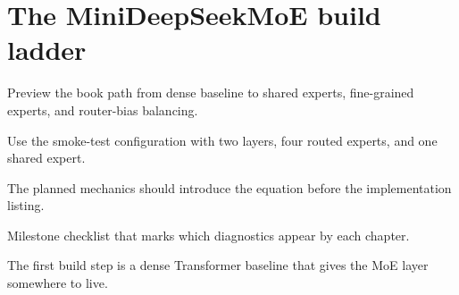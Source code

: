 \section{The MiniDeepSeekMoE build ladder}
\label{sec:ch01-the-minideepseekmoe-build-ladder}

Preview the book path from dense baseline to shared experts, fine-grained experts, and router-bias balancing.



Use the smoke-test configuration with two layers, four routed experts, and one shared expert.



The planned mechanics should introduce the equation before the implementation listing.





\begin{checkpointbox}
Milestone checklist that marks which diagnostics appear by each chapter.
\end{checkpointbox}

The first build step is a dense Transformer baseline that gives the MoE layer somewhere to live.
